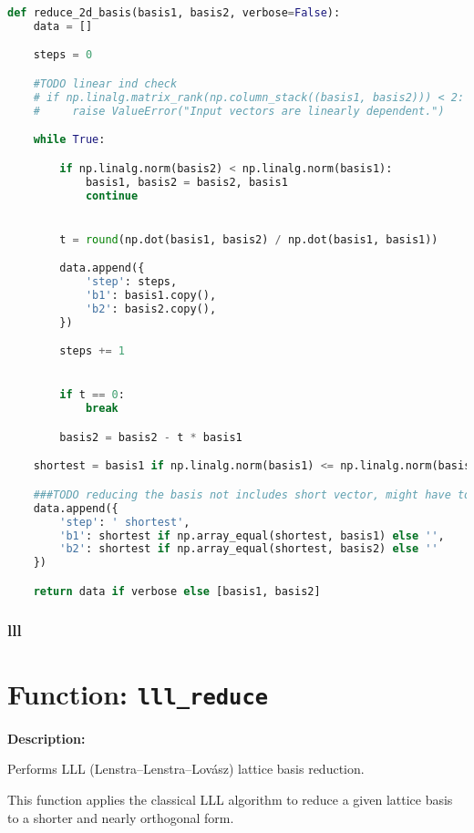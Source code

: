 \documentclass[a4paper,12pt]{article}
\begin{document}
\begin{lstlisting}[language=Python]
def reduce_2d_basis(basis1, basis2, verbose=False):
    data = []

    steps = 0

    #TODO linear ind check
    # if np.linalg.matrix_rank(np.column_stack((basis1, basis2))) < 2:
    #     raise ValueError("Input vectors are linearly dependent.")

    while True:

        if np.linalg.norm(basis2) < np.linalg.norm(basis1):
            basis1, basis2 = basis2, basis1
            continue


        t = round(np.dot(basis1, basis2) / np.dot(basis1, basis1))

        data.append({
            'step': steps,
            'b1': basis1.copy(),
            'b2': basis2.copy(),
        })

        steps += 1


        if t == 0:
            break

        basis2 = basis2 - t * basis1

    shortest = basis1 if np.linalg.norm(basis1) <= np.linalg.norm(basis2) else basis2

    ###TODO reducing the basis not includes short vector, might have to remove
    data.append({
        'step': ' shortest',
        'b1': shortest if np.array_equal(shortest, basis1) else '',
        'b2': shortest if np.array_equal(shortest, basis2) else ''
    })

    return data if verbose else [basis1, basis2]
\end{lstlisting}






\subsubsection{lll}

\section*{Function: \texttt{lll\_reduce}}

\textbf{Description:}

Performs LLL (Lenstra–Lenstra–Lovász) lattice basis reduction.

This function applies the classical LLL algorithm to reduce a given lattice basis
to a shorter and nearly orthogonal form.
\end{document}
